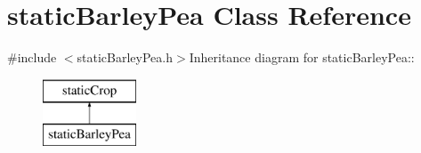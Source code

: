 \hypertarget{classstatic_barley_pea}{
\section{staticBarleyPea Class Reference}
\label{classstatic_barley_pea}
}


{\ttfamily \#include $<$staticBarleyPea.h$>$}Inheritance diagram for staticBarleyPea::\begin{figure}[H]
\begin{center}
\leavevmode
\includegraphics[height=2cm]{classstatic_barley_pea}
\end{center}
\end{figure}
